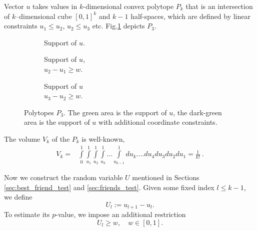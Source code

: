 \documentclass{llncs}
\begin{document}
Vector $u$ takes values in $k$-dimensional convex polytope $P_k$ that is 
an intersection of $k$--dimensional cube $[0, 1]^{k}$ and 
$k-1$ half-spaces, which are defined by linear constraints $u_1 \le u_2$, $u_2 \le u_3$ etc.
Fig.\ref{fig:polytop} depicts $P_3$. 
\begin{figure}
     \centering
     \begin{subfigure}[b]{0.3\textwidth}
         \centering 
         \caption{Support of $u$.
         \\\hspace{\textwidth} 
        }
         \label{fig:polytop}
     \end{subfigure}
     \begin{subfigure}[b]{0.3\textwidth}
         \centering 
         \caption{Support of $u$, 
         \\\hspace{\textwidth}
         $u_2 - u_1 \ge w$.}
         \label{fig:polytop1}
     \end{subfigure}
     \begin{subfigure}[b]{0.3\textwidth}
         \centering 
         \caption{Support of $u$ \\\hspace{\textwidth}$u_3 - u_2 \ge w$.}
         \label{fig:polytop2}
     \end{subfigure}
    \caption{Polytopes $P_3$. The green area is the support of $u$, the dark-green area is the support of $u$ with additional coordinate constraints.}
\end{figure}

The volume $V_k$ of the $P_k$ is well-known,
\begin{eqnarray*}
V_k = &\displaystyle \int\limits_0^1\int\limits_{u_1}^1\int\limits_{u_2}^1\int\limits_{u_3}^1...\int\limits_{u_{k-1}}^1 du_k....du_4 du_3 du_2 du_1 =  \frac{1}{k!}~.
\end{eqnarray*}

Now we construct the random variable $U$ mentioned in Sections \ref{sec:best_friend_test} and \ref{sec:friends_test}. Given some fixed index $l\leq k-1$, we define
\[
U_{l} := u_{l+1} - u_{l}. 
\]
To estimate its $p$-value, we impose an additional restriction
\[
U_{l} \ge w, \quad w \in [0, 1].
\]
\end{document}
